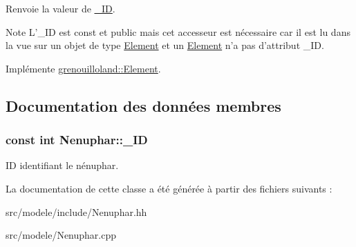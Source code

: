 \begin{DoxyReturn}{Renvoie}
la valeur de \hyperlink{classgrenouilloland_1_1Nenuphar_a048ada427d4e142923609003ad468c66}{\-\_\-\-I\-D}.
\end{DoxyReturn}
\begin{DoxyNote}{Note}
L'\-\_\-\-I\-D est const et public mais cet accesseur est nécessaire car il est lu dans la vue sur un objet de type \hyperlink{classgrenouilloland_1_1Element}{Element} et un \hyperlink{classgrenouilloland_1_1Element}{Element} n'a pas d'attribut \-\_\-\-I\-D. 
\end{DoxyNote}


Implémente \hyperlink{classgrenouilloland_1_1Element_aa05b1a2f2e0e8eb0e5ebf942b8934388}{grenouilloland\-::\-Element}.



\subsection{Documentation des données membres}
\hypertarget{classgrenouilloland_1_1Nenuphar_a048ada427d4e142923609003ad468c66}{
\subsubsection[{\-\_\-\-I\-D}]{\setlength{\rightskip}{0pt plus 5cm}const int Nenuphar\-::\-\_\-\-I\-D\hspace{0.3cm}{\ttfamily [static]}}}\label{classgrenouilloland_1_1Nenuphar_a048ada427d4e142923609003ad468c66}
I\-D identifiant le nénuphar. 

La documentation de cette classe a été générée à partir des fichiers suivants \-:\begin{DoxyCompactItemize}
\item 
src/modele/include/Nenuphar.\-hh\item 
src/modele/Nenuphar.\-cpp\end{DoxyCompactItemize}

